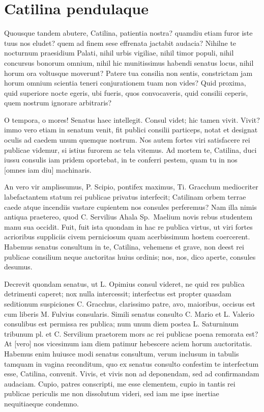 \documentclass[12pt, twoside]{article}
\begin{document}
%
\section*{Catilina pendulaque}
Quousque tandem abutere, Catilina, patientia nostra? quamdiu etiam furor iste tuus nos eludet? quem ad finem sese effrenata jactabit audacia? Nihilne te nocturnum praesidium Palati, nihil urbis vigiliae, nihil timor populi, nihil concursus bonorum omnium, nihil hic munitissimus habendi senatus locus, nihil horum ora voltusque moverunt? Patere tua consilia non sentis, constrictam jam horum omnium scientia teneri conjurationem tuam non vides? Quid proxima, quid superiore nocte egeris, ubi fueris, quos convocaveris, quid consilii ceperis, quem nostrum ignorare arbitraris?

O tempora, o mores! Senatus haec intellegit. Consul videt; hic tamen vivit. Vivit? immo vero etiam in senatum venit, fit publici consilii particeps, notat et designat oculis ad caedem unum quemque nostrum. Nos autem fortes viri satisfacere rei publicae videmur, si istius furorem ac tela vitemus. Ad mortem te, Catilina, duci iussu consulis iam pridem oportebat, in te conferri pestem, quam tu in nos [omnes iam diu] machinaris.

An vero vir amplissumus, P. Scipio, pontifex maximus, Ti. Gracchum mediocriter labefactantem statum rei publicae privatus interfecit; Catilinam orbem terrae caede atque incendiis vastare cupientem nos consules perferemus? Nam illa nimis antiqua praetereo, quod C. Servilius Ahala Sp.\ Maelium novis rebus studentem manu sua occidit. Fuit, fuit ista quondam in hac re publica virtus, ut viri fortes acrioribus suppliciis civem perniciosum quam acerbissimum hostem coercerent. Habemus senatus consultum in te, Catilina, vehemens et grave, non deest rei publicae consilium neque auctoritas huius ordinis; nos, nos, dico aperte, consules desumus.

Decrevit quondam senatus, ut L. Opimius consul videret, ne quid res publica detrimenti caperet; nox nulla intercessit; interfectus est propter quasdam seditionum suspiciones C. Gracchus, clarissimo patre, avo, maioribus, occisus est cum liberis M. Fulvius consularis. Simili senatus consulto C. Mario et L. Valerio consulibus est permissa res publica; num unum diem postea L. Saturninum tribunum pl. et C. Servilium praetorem mors ac rei publicae poena remorata est? At [vero] nos vicesimum iam diem patimur hebescere aciem horum auctoritatis. Habemus enim huiusce modi senatus consultum, verum inclusum in tabulis tamquam in vagina reconditum, quo ex senatus consulto confestim te interfectum esse, Catilina, convenit. Vivis, et vivis non ad deponendam, sed ad confirmandam audaciam. Cupio, patres conscripti, me esse clementem, cupio in tantis rei publicae periculis me non dissolutum videri, sed iam me ipse inertiae nequitiaeque condemno.
\end{document}
